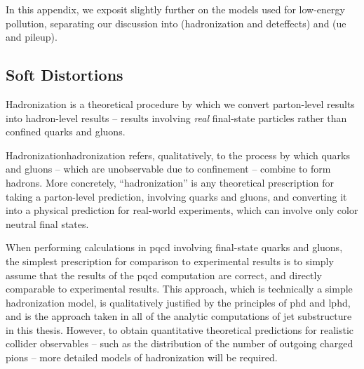 \begin{subappendices}
In this appendix, we exposit slightly further on the models used for low-energy pollution, separating our discussion into  (\gls{hadronization} and \gls{deteffects}) and  (\gls{ue} and \gls{pileup}).

\subsection{Soft Distortions}
\label{app:soft-distortions}

Hadronization is a theoretical procedure by which we convert parton-level results into hadron-level results -- results involving \textit{real} final-state particles rather than confined quarks and gluons.

\begin{definitionbox}{Hadronization}{hadronization}
     refers, qualitatively, to the process by which quarks and gluons -- which are unobservable due to confinement -- combine to form hadrons.
    More concretely, ``hadronization'' is any theoretical prescription for taking a parton-level prediction, involving quarks and gluons, and converting it into a physical prediction for real-world experiments, which can involve only color neutral final states.
\end{definitionbox}


When performing calculations in \gls{pqcd} involving final-state quarks and gluons, the simplest prescription for comparison to experimental results is to simply assume that the results of the \gls{pqcd} computation are correct, and directly comparable to experimental results.
%
This approach, which is technically a simple hadronization model, is qualitatively justified by the principles of \gls{phd} and \gls{lphd}, and is the approach taken in all of the analytic computations of jet substructure in this thesis.
%
However, to obtain quantitative theoretical predictions for realistic collider observables -- such as the distribution of the number of outgoing charged pions -- more detailed models of hadronization will be required.








\end{subappendices}
